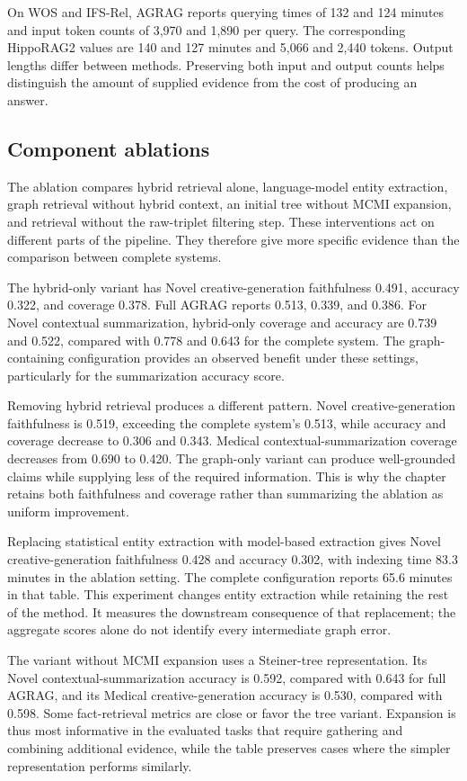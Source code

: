 On WOS and IFS-Rel, AGRAG reports querying times of 132 and 124 minutes and input token counts of 3,970 and 1,890 per query. The corresponding HippoRAG2 values are 140 and 127 minutes and 5,066 and 2,440 tokens. Output lengths differ between methods. Preserving both input and output counts helps distinguish the amount of supplied evidence from the cost of producing an answer.

\subsection{Component ablations}

The ablation compares hybrid retrieval alone, language-model entity extraction, graph retrieval without hybrid context, an initial tree without MCMI expansion, and retrieval without the raw-triplet filtering step. These interventions act on different parts of the pipeline. They therefore give more specific evidence than the comparison between complete systems.

The hybrid-only variant has Novel creative-generation faithfulness 0.491, accuracy 0.322, and coverage 0.378. Full AGRAG reports 0.513, 0.339, and 0.386. For Novel contextual summarization, hybrid-only coverage and accuracy are 0.739 and 0.522, compared with 0.778 and 0.643 for the complete system. The graph-containing configuration provides an observed benefit under these settings, particularly for the summarization accuracy score.

Removing hybrid retrieval produces a different pattern. Novel creative-generation faithfulness is 0.519, exceeding the complete system's 0.513, while accuracy and coverage decrease to 0.306 and 0.343. Medical contextual-summarization coverage decreases from 0.690 to 0.420. The graph-only variant can produce well-grounded claims while supplying less of the required information. This is why the chapter retains both faithfulness and coverage rather than summarizing the ablation as uniform improvement.

Replacing statistical entity extraction with model-based extraction gives Novel creative-generation faithfulness 0.428 and accuracy 0.302, with indexing time 83.3 minutes in the ablation setting. The complete configuration reports 65.6 minutes in that table. This experiment changes entity extraction while retaining the rest of the method. It measures the downstream consequence of that replacement; the aggregate scores alone do not identify every intermediate graph error.

The variant without MCMI expansion uses a Steiner-tree representation. Its Novel contextual-summarization accuracy is 0.592, compared with 0.643 for full AGRAG, and its Medical creative-generation accuracy is 0.530, compared with 0.598. Some fact-retrieval metrics are close or favor the tree variant. Expansion is thus most informative in the evaluated tasks that require gathering and combining additional evidence, while the table preserves cases where the simpler representation performs similarly.

